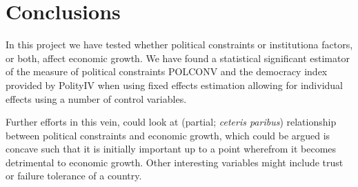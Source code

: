 \documentclass{article}\usepackage{graphicx, color}
\begin{document}
\section{Conclusions}

In this project we have tested whether political constraints or institutiona
factors, or both, affect economic growth. We have found a statistical
significant estimator of the measure of political constraints POLCONV
and the democracy index provided by PolityIV when using fixed effects
estimation allowing for individual effects using a number of control
variables.

Further efforts in this vein, could look at (partial; \emph{ceteris
paribus}) relationship between political constraints and economic
growth, which could be argued is concave such that it is initially
important up to a point wherefrom it becomes detrimental to economic
growth. Other interesting variables might include trust or failure
tolerance of a country.

\newpage{}


\end{document}
